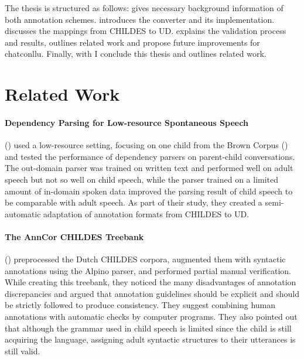 The thesis is structured as follows:  gives necessary background information of both annotation schemes.  introduces the converter and its implementation.  discusses the mappings from CHILDES to UD.  explains the validation process and results, outlines related work and propose future improvements for chatconllu. Finally, with  I conclude this thesis and outlines related work.

\section{Related Work}

\paragraph{Dependency Parsing for Low-resource Spontaneous Speech} %
\label{par:zoey}
(\cite{liu2021}) used a low-resource setting, focusing on one child from the Brown Corpus (\cite{brown1973}) and tested the performance of dependency parsers on parent-child conversations. The out-domain parser was trained on written text and performed well on adult speech but not so well on child speech, while the parser trained on a limited amount of in-domain spoken data improved the parsing result of child speech to be comparable with adult speech. As part of their study, they created a semi-automatic adaptation of annotation formats from CHILDES to UD.

\paragraph{The AnnCor CHILDES Treebank}
(\cite{odijk2018anncor}) preprocessed the Dutch CHILDES corpora, augmented them with syntactic annotations using the Alpino parser, and performed partial manual verification. While creating this treebank, they noticed the many disadvantages of annotation discrepancies and argued that annotation guidelines should be explicit and should be strictly followed to produce consistency. They suggest combining human annotations with automatic checks by computer programs. They also pointed out that although the grammar used in child speech is limited since the child is still acquiring the language, assigning adult syntactic structures to their utterances is still valid.

